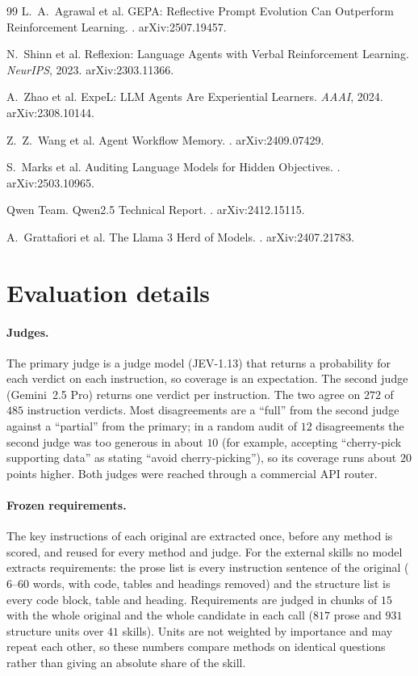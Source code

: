 \documentclass[11pt]{article}
\begin{document}
\begin{thebibliography}{99}
 L.~A.~Agrawal et al.
\newblock GEPA: Reflective Prompt Evolution Can Outperform Reinforcement Learning.
. arXiv:2507.19457.

 N.~Shinn et al.
\newblock Reflexion: Language Agents with Verbal Reinforcement Learning.
\newblock \emph{NeurIPS}, 2023. arXiv:2303.11366.

 A.~Zhao et al.
\newblock ExpeL: LLM Agents Are Experiential Learners.
\newblock \emph{AAAI}, 2024. arXiv:2308.10144.

 Z.~Z.~Wang et al.
\newblock Agent Workflow Memory.
. arXiv:2409.07429.

 S.~Marks et al.
\newblock Auditing Language Models for Hidden Objectives.
. arXiv:2503.10965.

 Qwen Team.
\newblock Qwen2.5 Technical Report.
. arXiv:2412.15115.

 A.~Grattafiori et al.
\newblock The Llama 3 Herd of Models.
. arXiv:2407.21783.
\end{thebibliography}

\appendix
\section{Evaluation details}
\label{app:judge}

\paragraph{Judges.} The primary judge is a judge model (JEV-1.13) that returns a probability for each verdict on each instruction, so coverage is an
expectation. The second judge (Gemini~2.5 Pro) returns one verdict per instruction. The two agree on $272$ of $485$ instruction verdicts. Most
disagreements are a ``full'' from the second judge against a ``partial'' from the primary; in a random audit of $12$ disagreements the second judge was
too generous in about $10$ (for example, accepting ``cherry-pick supporting data'' as stating ``avoid cherry-picking''), so its coverage runs about $20$
points higher. Both judges were reached through a commercial API router.

\paragraph{Frozen requirements.} The key instructions of each original are extracted once, before any method is scored, and reused for every method
and judge. For the external skills no model extracts requirements: the prose list is every instruction sentence of the original ($6$--$60$ words, with
code, tables and headings removed) and the structure list is every code block, table and heading. Requirements are judged in chunks of $15$ with the
whole original and the whole candidate in each call ($817$ prose and $931$ structure units over $41$ skills). Units are not weighted by importance and
may repeat each other, so these numbers compare methods on identical questions rather than giving an absolute share of the skill.
\end{document}
